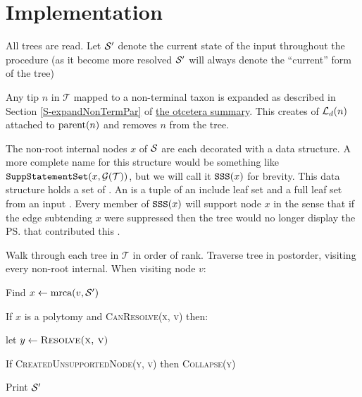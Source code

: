 \documentclass[11pt]{article}
\newcommand{\summDoc}{\href{http://phylo.bio.ku.edu/ot/summarizing-taxonomy-plus-trees.pdf}{the otcetera summary}\xspace}
\newcommand{\summRef}[1]{Section \ref{S-#1} of \summDoc}
\begin{document}
\section*{Implementation}
\begin{compactenum}
    \item All trees are read. Let $\mathcal{S}^{\prime}$ denote the current state of the input
    \summaryTree throughout the procedure (as it become more resolved $\mathcal{S}^{\prime}$ will
    always denote the ``current'' form of the tree)
    \item Any tip $n$ in $\mathcal{T}$ mapped to a non-terminal taxon is expanded as described in \summRef{expandNonTermPar}.
    This creates of $\mathcal{L}_d(n)$ attached to $\mbox{parent}(n)$ and removes $n$ from the tree.
    \item The non-root internal nodes $x$ of $\mathcal{S}$ are each decorated with a data structure. 
    A more complete name for this structure would be something like $\mbox{\texttt{SuppStatementSet}}(x, \mathcal{G}(\mathcal{T}))$, but we will call it $\mbox{\texttt{SSS}}(x)$ for brevity.
    This data structure holds a set of  {\incLSSSs}.
    An \incLSSS is a tuple of an include leaf set and a full leaf set from an input \pss.
    Every member of $\mbox{\texttt{SSS}}(x)$ will support node $x$ in the
    sense that if the edge subtending $x$ were suppressed then the tree would no longer 
    display the \ps that contributed this \incLSSS.
    \item Walk through each tree in $\mathcal{T}$ in order of rank. 
    Traverse tree in postorder, visiting every non-root internal.
    When visiting node $v$:
    \begin{compactenum}
        \item Find $x \leftarrow \mbox{mrca}(v, \mathcal{S}^{\prime})$
        \item If $x$ is a polytomy and \textsc{CanResolve(x, v)} then:
         \begin{compactenum}
            \item let $y\leftarrow \textsc{Resolve(x, v)}$
            \item If \textsc{CreatedUnsupportedNode(y, v)} then \textsc{Collapse(y)}
        \end{compactenum}
   \end{compactenum}
   \item Print $\mathcal{S}^{\prime}$
\end{compactenum}
\end{document}
